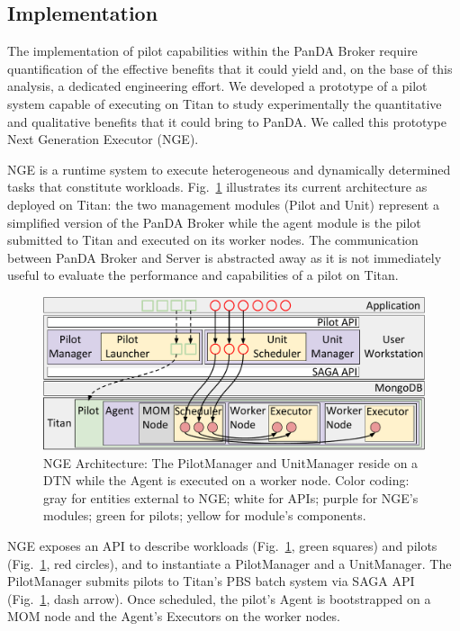 \subsection{Implementation}
\label{sec:arch}

The implementation of pilot capabilities within the PanDA Broker require
quantification of the effective benefits that it could yield and, on the base
of this analysis, a dedicated engineering effort. We developed a prototype of
a pilot system capable of executing on Titan to study experimentally the
quantitative and qualitative benefits that it could bring to PanDA\@. We
called this prototype Next Generation Executor (NGE).

NGE is a runtime system to execute heterogeneous and dynamically determined
tasks that constitute workloads. Fig.~\ref{fig:arch-overview} illustrates its
current architecture as deployed on Titan: the two management modules (Pilot
and Unit) represent a simplified version of the PanDA Broker while the agent
module is the pilot submitted to Titan and executed on its worker nodes. The
communication between PanDA Broker and Server is abstracted away as it is not
immediately useful to evaluate the performance and capabilities of a pilot on
Titan.

\begin{figure}
  \centering
   \includegraphics[width=\columnwidth]{figures/rp_architecture_compact_atlaswms_paper.pdf}
   \vspace{-0.3in}
  \caption{NGE Architecture: The PilotManager and UnitManager reside on a DTN
  while the Agent is executed on a worker node. Color coding: gray for
  entities external to NGE\@; white for APIs; purple for NGE's modules; green
  for pilots; yellow for module's components.}
\label{fig:arch-overview}
\end{figure}

NGE exposes an API to describe workloads (Fig.~\ref{fig:arch-overview}, green
squares) and pilots (Fig.~\ref{fig:arch-overview}, red circles), and to
instantiate a PilotManager and a UnitManager. The PilotManager submits pilots
to Titan's PBS batch system via SAGA API (Fig.~\ref{fig:arch-overview}, dash
arrow). %
Once scheduled, the pilot's Agent is bootstrapped on a MOM node and the
Agent's Executors on the worker nodes.

